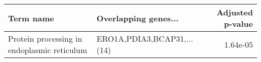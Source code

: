 \begin{tabular}{llr}
\toprule
                                  Term name &       Overlapping genes... &  Adjusted p-value \\
\midrule
Protein processing in endoplasmic reticulum & ERO1A,PDIA3,BCAP31,...(14) &          1.64e-05 \\
\bottomrule
\end{tabular}
